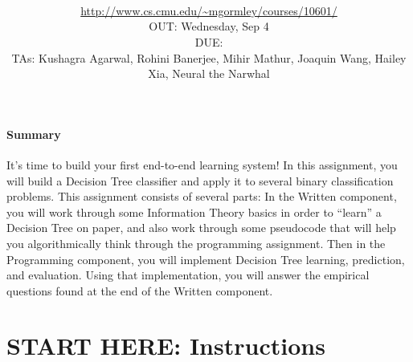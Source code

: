 \documentclass[11pt,addpoints,answers]{exam}
\title{\textsc{\hwName}
} %
\author{\courseName\\
\url{http://www.cs.cmu.edu/~mgormley/courses/10601/} \\
OUT: Wednesday, Sep 4 \\
DUE: \dueDate{} \\ 
TAs: Kushagra Agarwal, Rohini Banerjee, Mihir Mathur, Joaquin Wang, Hailey Xia, Neural the Narwhal
}
\date{}
\date{}
\begin{document}
\maketitle

\vspace*{-6mm}
\begin{notebox}
\paragraph{Summary} It's time to build your first end-to-end learning system! In this assignment, you will build a Decision Tree classifier and apply it to several binary classification problems. This assignment consists of several parts: In the Written component, you will work through some Information Theory basics in order to ``learn'' a Decision Tree on paper, and also work through some pseudocode that will help you algorithmically think through the programming assignment. Then in the Programming component, you will implement Decision Tree learning, prediction, and evaluation. Using that implementation, you will answer the empirical questions found at the end of the Written component.
\end{notebox}
\vspace*{-5mm}\section*{START HERE: Instructions}
\end{document}
